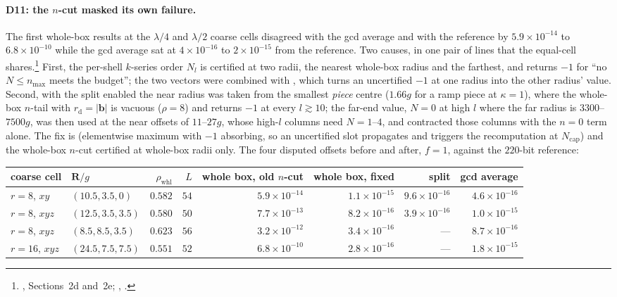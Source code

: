 \paragraph{D11: the $n$-cut masked its own failure.} The first whole-box results at the
$\lambda/4$ and $\lambda/2$ coarse cells disagreed with the gcd average and with the
reference by $5.9\times10^{-14}$ to $6.8\times10^{-10}$ while the gcd average sat at
$4\times10^{-16}$ to $2\times10^{-15}$ from the reference. Two causes, in one pair of lines
that the equal-cell  shares.\footnote{,
Sections~2d and~2e; , .} First,
the per-shell $k$-series order $N_l$ is certified at two radii, the nearest whole-box radius
and the farthest, and  returns $-1$ for ``no $N\le n_{\max}$ meets the
budget''; the two vectors were combined with , which turns an uncertified $-1$
at one radius into the other radius' value. Second, with the split enabled the near radius
was taken from the smallest \emph{piece} centre ($1.66g$ for a ramp piece at $\kappa = 1$),
where the whole-box $n$-tail with $r_{\mathrm{d}} = |\mathbf{b}|$ is vacuous ($\rho = 8$)
and returns $-1$ at every $l\gtrsim10$; the far-end value, $N = 0$ at high $l$ where the
far radius is $3300$--$7500g$, was then used at the near offsets of $11$--$27g$, whose
high-$l$ columns need $N = 1$--$4$, and  contracted those columns with the
$n = 0$ term alone. The fix is  (elementwise maximum with $-1$ absorbing, so
an uncertified slot propagates and triggers the recomputation at $N_{\mathrm{cap}}$) and the
whole-box $n$-cut certified at whole-box radii only. The four disputed offsets before and
after, $f = 1$, against the $220$-bit reference:

\begin{center}\footnotesize
\begin{tabular}{@{}llrrrrrr@{}}
\toprule
coarse cell & $\mathbf{R}/g$ & $\rho_{\mathrm{whl}}$ & $L$ & whole box, old $n$-cut & whole box, fixed & split & gcd average\\
\midrule
$r=8$, $xy$ & $(10.5,3.5,0)$ & $0.582$ & $54$ & $5.9\times10^{-14}$ & $1.1\times10^{-15}$ & $9.6\times10^{-16}$ & $4.6\times10^{-16}$\\
$r=8$, $xyz$ & $(12.5,3.5,3.5)$ & $0.580$ & $50$ & $7.7\times10^{-13}$ & $8.2\times10^{-16}$ & $3.9\times10^{-16}$ & $1.0\times10^{-15}$\\
$r=8$, $xyz$ & $(8.5,8.5,3.5)$ & $0.623$ & $56$ & $3.2\times10^{-12}$ & $3.4\times10^{-16}$ & --- & $8.7\times10^{-16}$\\
$r=16$, $xyz$ & $(24.5,7.5,7.5)$ & $0.551$ & $52$ & $6.8\times10^{-10}$ & $2.8\times10^{-16}$ & --- & $1.8\times10^{-15}$\\
\bottomrule
\end{tabular}
\end{center}

